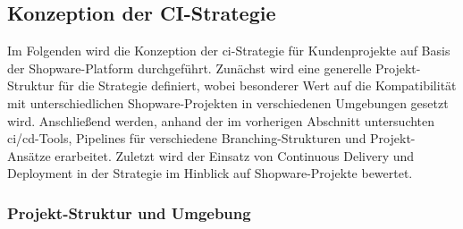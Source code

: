 \subsection{Konzeption der CI-Strategie} \label{subsec:03-concept-3}

Im Folgenden wird die Konzeption der \acrshort{ci}-Strategie für Kundenprojekte auf Basis der Shopware-Platform
durchgeführt.
Zunächst wird eine generelle Projekt-Struktur für die Strategie definiert, wobei besonderer Wert auf die
Kompatibilität mit unterschiedlichen Shopware-Projekten in verschiedenen Umgebungen gesetzt wird.
Anschließend werden, anhand der im vorherigen Abschnitt untersuchten \acrshort{ci}/\acrshort{cd}-Tools, Pipelines für
verschiedene Branching-Strukturen und Projekt-Ansätze erarbeitet.
Zuletzt wird der Einsatz von Continuous Delivery und Deployment in der Strategie im Hinblick auf Shopware-Projekte
bewertet.

\subsubsection{Projekt-Struktur und Umgebung}

